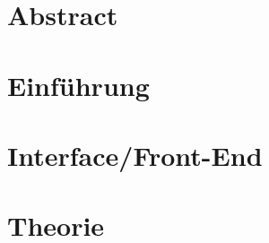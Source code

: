 \documentclass[12pt,ngerman,seminar]{dbvstudentwork}
\begin{document}
  \begin{dbvstudentworkTitlepage}




    \Deadline{\today}


  \end{dbvstudentworkTitlepage}

\section*{Abstract} %

\clearpage
\tableofcontents
\clearpage


\section{Einführung}
\label{sec:introduction}

\cite{PA21}

\section{Interface/Front-End}
\label{sec:frontend}

\section{Theorie}
\label{sec:theorie}
\end{document}
